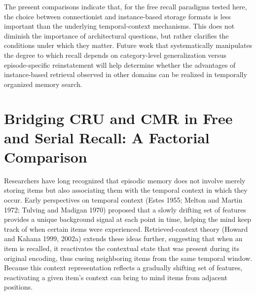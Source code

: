 \documentclass[
  letterpaper,
  11pt,
  english,
  singlespacing,
  headsepline]{MastersDoctoralThesis}
\begin{document}
The present comparisons indicate that, for the free recall paradigms
tested here, the choice between connectionist and instance-based storage
formats is less important than the underlying temporal-context
mechanisms. This does not diminish the importance of architectural
questions, but rather clarifies the conditions under which they matter.
Future work that systematically manipulates the degree to which recall
depends on category-level generalization versus episode-specific
reinstatement will help determine whether the advantages of
instance-based retrieval observed in other domains can be realized in
temporally organized memory search.


\chapter{Bridging CRU and CMR in Free and Serial Recall: A Factorial
Comparison}\label{bridging-cru-and-cmr-in-free-and-serial-recall-a-factorial-comparison}

Researchers have long recognized that episodic memory does not involve
merely storing items but also associating them with the temporal context
in which they occur. Early perspectives on temporal context (Estes 1955;
Melton and Martin 1972; Tulving and Madigan 1970) proposed that a slowly
drifting set of features provides a unique background signal at each
point in time, helping the mind keep track of when certain items were
experienced. Retrieved-context theory (Howard and Kahana 1999, 2002a)
extends these ideas further, suggesting that when an item is recalled,
it reactivates the contextual state that was present during its original
encoding, thus cueing neighboring items from the same temporal window.
Because this context representation reflects a gradually shifting set of
features, reactivating a given item's context can bring to mind items
from adjacent positions.
\end{document}
